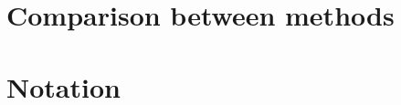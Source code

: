 \documentclass[12pt]{article}
\begin{document}
\section{Comparison between methods}





\section{Notation}



\printbibliography[heading=bibintoc, title={References}]
\end{document}
